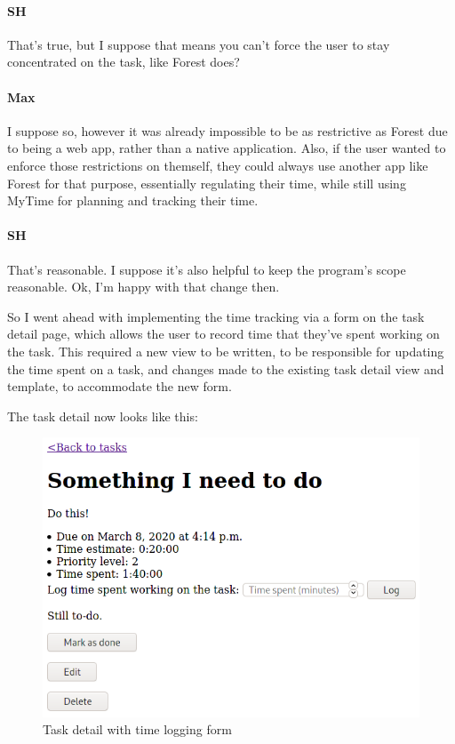 \documentclass{article}
\begin{document}
\paragraph{SH} That's true,
but I suppose that means you can't force the user to stay concentrated on the task,
like Forest does?
\paragraph{Max} I suppose so,
however it was already impossible to be as restrictive as Forest due to being a web app,
rather than a native application.
Also, if the user wanted to enforce those restrictions on themself,
they could always use another app like Forest for that purpose,
essentially regulating their time,
while still using MyTime for planning and tracking their time.
\paragraph{SH} That's reasonable.
I suppose it's also helpful to keep the program's scope reasonable.
Ok, I'm happy with that change then.

So I went ahead with implementing the time tracking via a form on the task detail page,
which allows the user to record time that they've spent working on the task.
This required a new view to be written,
to be responsible for updating the time spent on a task,
and changes made to the existing task detail view and template,
to accommodate the new form.

The task detail now looks like this:
\begin{figure}[H]
  \centering
  \includegraphics[width=\linewidth]{Screenshots/task_detail_with_time.png}
  \caption{Task detail with time logging form}
  \label{fig:task_detail2}
\end{figure}
\end{document}
